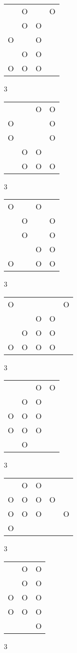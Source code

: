 \begin{tabular}{|m{0.2cm}m{0.2cm}m{0.2cm}m{0.2cm}|}\hline
 &O& &O\\
 &O&O& \\
O& &O& \\
 &O&O& \\
O&O&O& \\
\hline\end{tabular}3
\begin{tabular}{|m{0.2cm}m{0.2cm}m{0.2cm}m{0.2cm}|}\hline
 & &O&O\\
O& & &O\\
O& & &O\\
 &O&O& \\
 &O&O&O\\
\hline\end{tabular}3
\begin{tabular}{|m{0.2cm}m{0.2cm}m{0.2cm}m{0.2cm}|}\hline
O& &O& \\
 &O& &O\\
 &O& &O\\
 & &O&O\\
O& &O&O\\
\hline\end{tabular}3
\begin{tabular}{|m{0.2cm}m{0.2cm}m{0.2cm}m{0.2cm}m{0.2cm}|}\hline
O& & & &O\\
 & &O&O& \\
 &O&O&O& \\
O&O&O&O& \\
\hline\end{tabular}3
\begin{tabular}{|m{0.2cm}m{0.2cm}m{0.2cm}m{0.2cm}|}\hline
 & &O&O\\
 &O&O& \\
O&O&O& \\
O&O&O& \\
 &O& & \\
\hline\end{tabular}3
\begin{tabular}{|m{0.2cm}m{0.2cm}m{0.2cm}m{0.2cm}m{0.2cm}|}\hline
 &O&O& & \\
O&O&O&O& \\
O&O&O& &O\\
O& & & & \\
\hline\end{tabular}3
\begin{tabular}{|m{0.2cm}m{0.2cm}m{0.2cm}|}\hline
 &O&O\\
 &O&O\\
O&O&O\\
O&O&O\\
 & &O\\
\hline\end{tabular}3
